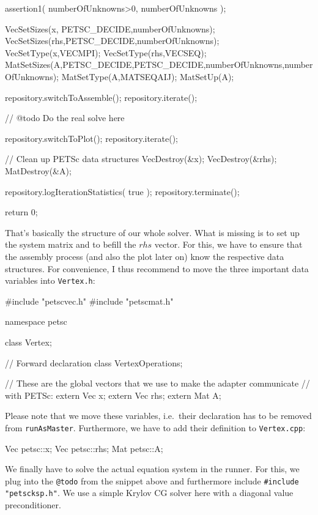 \begin{code}
{  assertion1( numberOfUnknowns>0, numberOfUnknowns );

  VecSetSizes(x,  PETSC_DECIDE,numberOfUnknowns);
  VecSetSizes(rhs,PETSC_DECIDE,numberOfUnknowns);
  VecSetType(x,VECMPI);
  VecSetType(rhs,VECSEQ);
  MatSetSizes(A,PETSC_DECIDE,PETSC_DECIDE,numberOfUnknowns,numberOfUnknowns);
  MatSetType(A,MATSEQAIJ);
  MatSetUp(A);
  
  repository.switchToAssemble(); repository.iterate();

  // @todo Do the real solve here

  repository.switchToPlot(); repository.iterate();


  // Clean up PETSc data structures
  VecDestroy(&x);
  VecDestroy(&rhs);
  MatDestroy(&A);

  repository.logIterationStatistics( true );
  repository.terminate();

  return 0;
}
\end{code}

\noindent
That's basically the structure of our whole solver.
What is missing is to set up the system matrix and to befill the $rhs$ vector.
For this, we have to ensure that the assembly process (and also the plot later
on) know the respective data structures.
For convenience, I thus recommend to move the three important data variables
into \texttt{Vertex.h}:

\begin{code}
#include "petscvec.h"
#include "petscmat.h"


namespace petsc { 
  class Vertex;
      
  // Forward declaration
  class VertexOperations;

  // These are the global vectors that we use to make the adapter communicate
  // with PETSc:
  extern Vec  x;
  extern Vec  rhs;
  extern Mat  A;
}
\end{code}

\noindent
Please note that we move these variables, i.e.~their declaration has to be
removed from \texttt{runAsMaster}. Furthermore, we have to add their definition
to \texttt{Vertex.cpp}:

\begin{code}
Vec  petsc::x;
Vec  petsc::rhs;
Mat  petsc::A;
\end{code}

We finally have to solve the actual equation system in the runner. For this, we
plug into the \texttt{@todo} from the snippet above and furthermore include
\texttt{\#include "petscksp.h"}. We use a simple Krylov CG solver here with a
diagonal value preconditioner.

